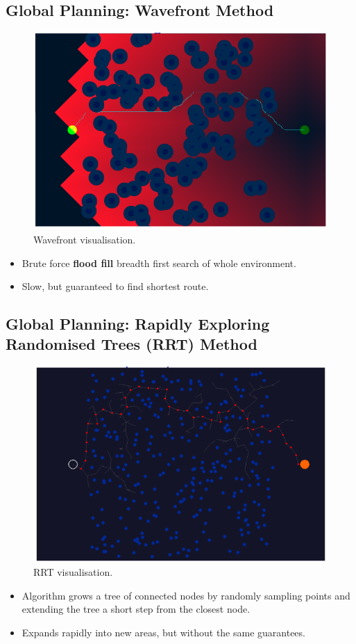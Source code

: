 \documentclass[11pt]{article}
\begin{document}
\subsection{Global Planning: Wavefront Method}
\begin{figure}[h]
  \caption{Wavefront visualisation.}
  \includegraphics[scale=0.4]{wavefront}
  \centering
\end{figure}

\begin{itemize}
  \item Brute force \textbf{flood fill} breadth first search of whole environment.
  \item Slow, but guaranteed to find shortest route.
\end{itemize}

\subsection{Global Planning: Rapidly Exploring Randomised Trees (RRT) Method}
\begin{figure}[h]
  \caption{RRT visualisation.}
  \includegraphics[scale=0.4]{rrt}
  \centering
\end{figure}

\begin{itemize}
  \item Algorithm grows a tree of connected nodes by randomly sampling points and extending the tree a short step from the closest node.
  \item Expands rapidly into new areas, but without the same guarantees.
\end{itemize}
\end{document}
